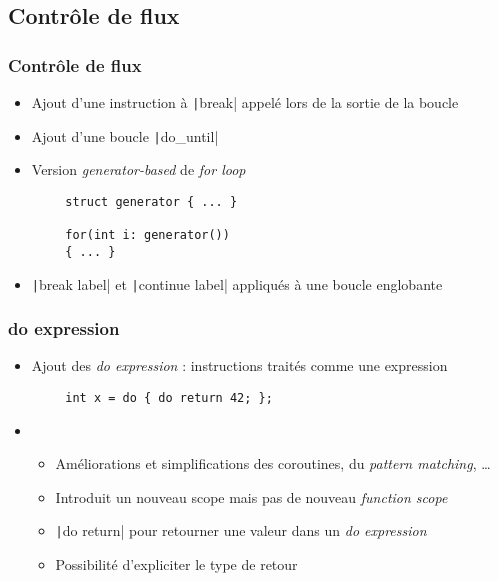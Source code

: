 \documentclass[C++.tex]{subfiles}
\begin{document}
\subsection*{Contrôle de flux}
\begin{frame}[fragile]
	\frametitle{Contrôle de flux}
	\begin{itemize}
		\item Ajout d'une instruction à \texttt|break| appelé lors de la sortie de la boucle


		\item Ajout d'une boucle \texttt|do_until|
		\item Version \textit{generator-based} de \textit{for loop}
	\end{itemize}

	\begin{verbatim}
		struct generator { ... }

		for(int i: generator())
		{ ... }
	\end{verbatim}

	\begin{itemize}
		\item \texttt|break label| et \texttt|continue label| appliqués à une boucle englobante
	\end{itemize}

\end{frame}

\begin{frame}[fragile]
	\frametitle{do expression}
	\begin{itemize}
		\item Ajout des \og{}\textit{do expression}\fg{} : instructions traités comme une expression
	\end{itemize}

	\begin{verbatim}
		int x = do { do return 42; };
	\end{verbatim}

	\begin{itemize}
		\item[]
		\begin{itemize}
			\item Améliorations et simplifications des coroutines, du \textit{pattern matching}, \ldots{}
			\item Introduit un nouveau scope mais pas de nouveau \textit{function scope}
			\item \texttt|do return| pour retourner une valeur dans un \textit{do expression}
			\item Possibilité d'expliciter le type de retour
		\end{itemize}
	\end{itemize}

\end{frame}
\end{document}
